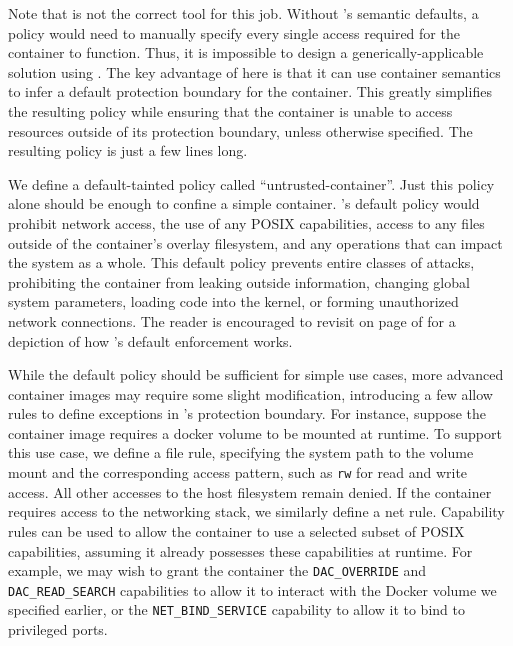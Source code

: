 Note that \bpfbox{} is not the correct tool for this job. Without \bpfcontain{}'s semantic
defaults, a \bpfbox{} policy would need to manually specify every single access required
for the container to function. Thus, it is impossible to design a generically-applicable
solution using \bpfbox{}. The key advantage of \bpfcontain{} here is that it can use
container semantics to infer a default protection boundary for the container. This greatly
simplifies the resulting policy while ensuring that the container is unable to access
resources outside of its protection boundary, unless otherwise specified. The resulting
\bpfcontain{} policy is just a few lines long.

We define a default-tainted \bpfcontain{} policy called \enquote{untrusted-container}.
Just this policy alone should be enough to confine a simple container. \bpfcontain{}'s
default policy would prohibit network access, the use of any POSIX capabilities, access to
any files outside of the container's overlay filesystem, and any operations that can
impact the system as a whole. This default policy prevents entire classes of attacks,
prohibiting the container from leaking outside information, changing global system
parameters, loading code into the kernel, or forming unauthorized network connections. The
reader is encouraged to revisit  on page
\pageref{fig:bpfcontain-enforcement} of  for a depiction of how
\bpfcontain{}'s default enforcement works.

While the \bpfcontain{} default policy should be sufficient for simple use cases, more
advanced container images may require some slight modification, introducing a few allow
rules to define exceptions in \bpfcontain{}'s protection boundary. For instance, suppose
the container image requires a docker volume to be mounted at runtime. To support this use
case, we define a file rule, specifying the system path to the volume mount and the
corresponding access pattern, such as \texttt{rw} for read and write access. All other
accesses to the host filesystem remain denied. If the container requires access to the
networking stack, we similarly define a net rule.  Capability rules can be used to allow
the container to use a selected subset of POSIX capabilities, assuming it already
possesses these capabilities at runtime. For example, we may wish to grant the container
the \texttt{DAC\_OVERRIDE} and \texttt{DAC\_READ\_SEARCH} capabilities to allow it to
interact with the Docker volume we specified earlier, or the \texttt{NET\_BIND\_SERVICE}
capability to allow it to bind to privileged ports.

